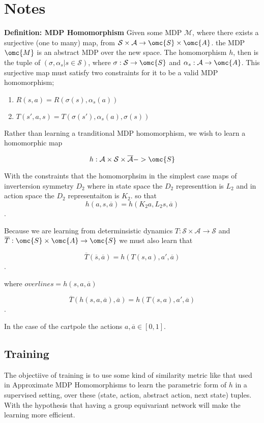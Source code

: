 \section{Notes}

\textbf{Definition: MDP Homomorphism} Given some MDP $\mathcal{M}$, where there
exists a surjective (one to many) map, from $\mathcal{S} \times \mathcal{A} \rightarrow \omc{S} \times
	\omc{A}$. the MDP $\omc{M}$ is an abstract MDP over the new space. The
homomorphism $h$, then is the tuple of $(\sigma, \alpha_s|s \in \mathcal{S})$, where
$\sigma: \mathcal{S} \rightarrow \omc{S}$ and $\alpha_s : \mathcal{A} \rightarrow \omc{A}$.
This surjective map must satisfy two constraints for it to be a valid MDP
homomorphism; \begin{enumerate} \item $R(s, a) = R(\sigma(s), \alpha_s(a))$
	\item $T(s', a, s) = T(\sigma(s'), \alpha_s(a), \sigma(s))$ \end{enumerate}


Rather than learning a tranditional MDP homomorphism, we wish to learn a homomorphic map

$$h: \mathcal{A} \times \mathcal{S} \times \overline{\mathcal{A}} -> \omc{S}$$

With the constraints that the homomorphsim in the simplest case maps of invertersion symmetry $D_2$ where in state space the $D_2$ representtion is $L_2$ and in action space the $D_2$ representaiton is $K_2$. so that $$h(a, s, \overline{a}) = h(K_2 a, L_2 s, \overline{a})$$.

Because we are learning from determinsistic dynamics $T: \mathcal{S} \times \mathcal{A} \rightarrow \mathcal{S}$ and $\overline{T}: \omc{S} \times \omc{A} \rightarrow \omc{S}$ we must also learn that

$$\overline{T}(\overline{s}, \overline{a}) = h(T(s, a), a', \overline{a})$$.

where $overline{s} = h(s, a, \overline{a})$

$$\overline{T}(h(s, a, \overline{a}), \overline{a}) = h(T(s, a), a', \overline{a})$$.


In the case of the cartpole the actions $a, \overline{a} \in [0, 1]$.


\subsection{Training}
The objectiive of training is to use some kind of similarity metric like that used in Approximate MDP Homomorphisms to learn the parametric form of $h$ in a supervised setting, over these (state, action, abstract action, next state) tuples.
With the hypothesis that having a group equivariant network will make the learning more efficient.
